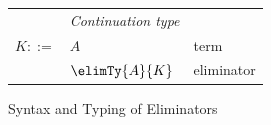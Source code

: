 \begin{figure}
   \begin{minipage}[t]{0.5\textwidth}
      \begin{tabularx}{\textwidth}{rL{2.7cm}L{3cm}}
      &\textit{Continuation type}&
      \\
      $K ::=$
      &
      $A$
      &
      term
      \\
      &
      $\elimTy{A}{K}$
      &
      eliminator
      \\[0mm]
      \end{tabularx}
   \end{minipage}
   \caption{Syntax and Typing of Eliminators}
\end{figure}